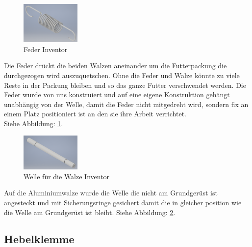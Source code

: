 \begin{figure}
\vspace{-20pt}
  \begin{center}
    \includegraphics[width=0.26\textwidth]{Bilder/Inventor/Feder}
  \end{center}
  \caption{Feder Inventor}
  \label{Feder_Inventor}
\end{figure}

Die Feder drückt die beiden Walzen aneinander um die Futterpackung die durchgezogen wird auszuquetschen. Ohne die Feder und Walze könnte zu viele Reste in der Packung bleiben und so das ganze Futter verschwendet werden. Die Feder wurde von uns konstruiert und auf eine eigene Konstruktion gehängt unabhängig von der Welle, damit die Feder nicht mitgedreht wird, sondern fix an einem Platz positioniert ist an den sie ihre Arbeit verrichtet. \\Siehe Abbildung: \ref{Feder_Inventor}.\\

\begin{figure}
\vspace{-20pt}
  \begin{center}
    \includegraphics[width=0.26\textwidth]{Bilder/Inventor/Walzen_Welle}
  \end{center}
  \caption{Welle für die Walze Inventor}
  \label{Walzen_Welle_Inventor}
\end{figure}

Auf die Aluminiumwalze wurde die Welle die nicht am Grundgerüst ist angesteckt und mit Sicherungsringe gesichert damit die in gleicher position wie die Welle am Grundgerüst ist bleibt. Siehe Abbildung: \ref{Walzen_Welle_Inventor}.\\ 
\subsection{Hebelklemme}

